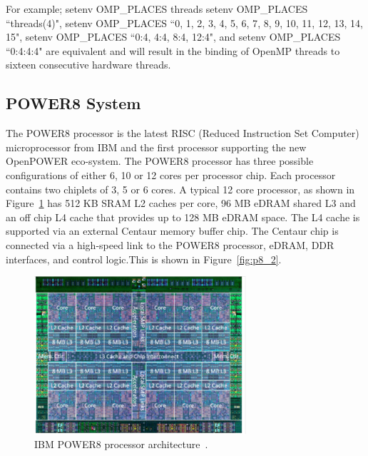 For example; setenv OMP\_PLACES threads
setenv OMP\_PLACES ``threads(4)", setenv OMP\_PLACES ``{0, 1, 2, 3}, {4, 5, 6, 7},{ 8, 9, 10, 11},{ 12, 13, 14, 15}", setenv OMP\_PLACES ``{0:4}, {4:4}, {8:4}, {12:4}", and setenv OMP\_PLACES ``{0:4}:4:4" are equivalent and will result in the binding of OpenMP threads to sixteen consecutive hardware threads. 

\subsection{POWER8 System}
The POWER8 processor is the latest RISC (Reduced Instruction Set Computer) microprocessor from IBM and the first processor supporting the new OpenPOWER eco-system. 
The POWER8 processor has three possible configurations of either 6, 10 or 12 cores per processor chip. Each processor contains two chiplets of 3, 5 or 6 cores.  A typical 12 core processor, as shown in Figure~\ref{fig:p8_1} has  512 KB SRAM L2 caches per core, 96 MB eDRAM shared L3 and an off chip L4 cache that provides up to 128 MB eDRAM space. The L4 cache is supported via an external Centaur memory buffer chip. The Centaur chip is connected via a high-speed link to the POWER8 processor, eDRAM, DDR interfaces, and control logic.This is shown in Figure~\ref{fig:p8_2}. 

\begin{figure}[h!]
  \centering
  \includegraphics[height=0.4\textwidth, width=0.7\textwidth]{./Images/P8.pdf}
       \caption{IBM POWER8 processor architecture~\cite{IBM_P8}.}
       \label{fig:p8_1}
\end{figure}

